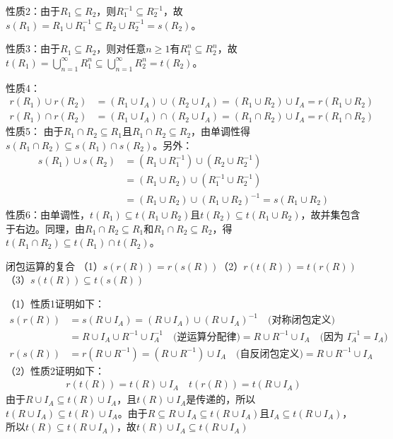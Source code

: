 性质2：由于$R_1 \subseteq R_2$，则$R_1^{-1} \subseteq R_2^{-1}$，故$s(R_1) = R_1 \cup R_1^{-1} \subseteq R_2 \cup R_2^{-1} = s(R_2)$。

性质3：由于$R_1 \subseteq R_2$，则对任意$n \geq 1$有$R_1^n \subseteq R_2^n$，故$t(R_1) = \bigcup_{n=1}^{\infty} R_1^n \subseteq \bigcup_{n=1}^{\infty} R_2^n = t(R_2)$。

性质4：\vspace{-20pt}\begin{align*}
r(R_1) \cup r(R_2) &= (R_1 \cup I_A) \cup (R_2 \cup I_A) = (R_1 \cup R_2) \cup I_A = r(R_1 \cup R_2) \\
r(R_1) \cap r(R_2) &= (R_1 \cup I_A) \cap (R_2 \cup I_A) = (R_1 \cap R_2) \cup I_A = r(R_1 \cap R_2)
\end{align*}
性质5：
由于$R_1 \cap R_2 \subseteq R_1$且$R_1 \cap R_2 \subseteq R_2$，由单调性得$s(R_1 \cap R_2) \subseteq s(R_1) \cap s(R_2)$。另外：\vspace{-10pt}
\begin{align*}
s(R_1) \cup s(R_2) &= (R_1 \cup R_1^{-1}) \cup (R_2 \cup R_2^{-1}) \\
&= (R_1 \cup R_2) \cup (R_1^{-1} \cup R_2^{-1}) \\
&= (R_1 \cup R_2) \cup (R_1 \cup R_2)^{-1} = s(R_1 \cup R_2)
\end{align*}
性质6：由单调性，$t(R_1) \subseteq t(R_1 \cup R_2)$且$t(R_2) \subseteq t(R_1 \cup R_2)$，故并集包含于右边。同理，由$R_1 \cap R_2 \subseteq R_1$和$R_1 \cap R_2 \subseteq R_2$，得$t(R_1 \cap R_2) \subseteq t(R_1) \cap t(R_2)$。
\begin{theorem}{闭包运算的复合}{}
（1）$s(r(R)) = r(s(R))$\quad（2）$r(t(R)) = t(r(R))$\quad（3）$s(t(R)) \subseteq t(s(R))$
\end{theorem}
（1）性质1证明如下：
\begin{align*}
s(r(R)) &= s(R \cup I_A) = (R \cup I_A) \cup (R \cup I_A)^{-1} \quad \text{(对称闭包定义)} \\
&= R \cup I_A \cup R^{-1} \cup I_A^{-1} \quad \text{(逆运算分配律)} = R \cup R^{-1} \cup I_A \quad \text{(因为 $I_A^{-1} = I_A$)} \\
r(s(R)) &= r(R \cup R^{-1}) = (R \cup R^{-1}) \cup I_A \quad \text{(自反闭包定义)} = R \cup R^{-1} \cup I_A
\end{align*}
（2）性质2证明如下：
\begin{align*}
r(t(R)) = t(R) \cup I_A \quad 
t(r(R)) = t(R \cup I_A) 
\end{align*}
由于$R \cup I_A \subseteq t(R) \cup I_A$，且$t(R) \cup I_A$是传递的，所以$t(R \cup I_A) \subseteq t(R) \cup I_A$。由于$R \subseteq R \cup I_A \subseteq t(R \cup I_A)$且$I_A \subseteq t(R \cup I_A)$，所以$t(R) \subseteq t(R \cup I_A)$，故$t(R) \cup I_A \subseteq t(R \cup I_A)$\\
